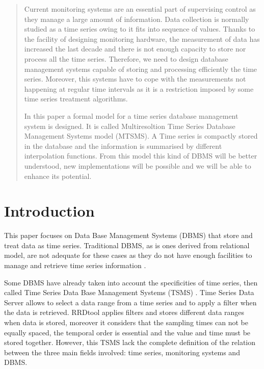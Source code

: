 \begin{abstract}
  Current monitoring systems are an essential part of supervising
  control as they manage a large amount of information. Data
  collection is normally studied as a time series owing to it fits
  into sequence of values.  Thanks to the facility of designing
  monitoring hardware, the measurement of data has increased the last
  decade and there is not enough capacity to store nor process all the
  time series. Therefore, we need to design database management
  systems capable of storing and processing efficiently the time
  series. Moreover, this systems have to cope with the measurements
  not happening at regular time intervals as it is a restriction
  imposed by some time series treatment algorithms.

  In this paper a formal model for a time series database management
  system is designed.  It is called Multiresoltion Time Series
  Database Management Systems model (MTSMS). A Time series is
  compactly stored in the database and the information is summarised
  by different interpolation functions. From this model this kind of
  DBMS will be better understood, new implementations will be possible
  and we will be able to enhance its potential.
\end{abstract}



\section{Introduction}

This paper focuses on Data Base Management Systems (DBMS) that store
and treat data as time series.  Traditional DBMS, as is ones derived
from relational model, are not adequate for these cases as they do not
have enough facilities to manage and retrieve time series
information \parencite{schmidt95}.

Some DBMS have already taken into account the specificities of time
series, then called Time Series Data Base Management Systems
(TSMS) \parencite{dreyer94}.  Time Series Data
Server \parencite{weigel10} allows to select a data range from a time
series and to apply a filter when the data is retrieved.
RRDtool \parencite{rrdtool} applies filters and stores different data
ranges when data is stored, moreover it considers that the sampling
times can not be equally spaced, the temporal order is essential and
the value and time must be stored together. However, this TSMS lack
the complete definition of the relation between the three main fields
involved: time series, monitoring systems and DBMS.

